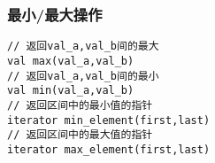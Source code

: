 \subsubsection{最小/最大操作}
\begin{lstlisting}
// 返回val_a,val_b间的最大
val max(val_a,val_b)
// 返回val_a,val_b间的最小
val min(val_a,val_b)
// 返回区间中的最小值的指针
iterator min_element(first,last)
// 返回区间中的最大值的指针
iterator max_element(first,last)
\end{lstlisting}
